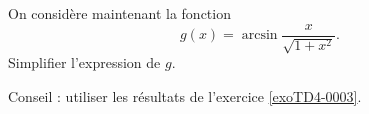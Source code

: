 
\begin{exercice}\label{exomazhe-0007}

	On considère maintenant la fonction
	\begin{equation}
		g(x)=\arcsin\frac{ x }{ \sqrt{1+x^2} }.
	\end{equation}
	Simplifier l'expression de $g$.

	Conseil : utiliser les résultats de l'exercice \ref{exoTD4-0003}.

\end{exercice}

